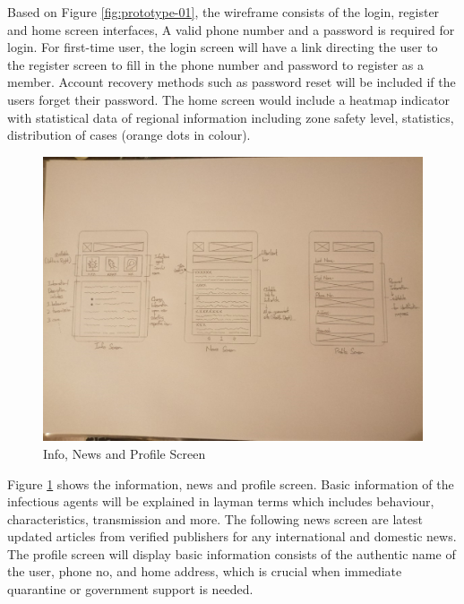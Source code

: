       \par Based on Figure \ref{fig:prototype-01}, the wireframe consists of the login, register and home screen interfaces, A valid phone number and a password is required for login. For first-time user, the login screen will have a link directing the user to the register screen to fill in the phone number and password to register as a member. Account recovery methods such as password reset will be included if the users forget their password. The home screen would include a heatmap indicator with statistical data of regional information including zone safety level, statistics, distribution of cases (orange dots in colour).
      
      \begin{figure}[H]
        \centering
        \includegraphics[width=18cm]{img/low-fidelity-prototype/sketch-2.png}
        \caption{Info, News and Profile Screen}
        \label{fig:prototype-02}
      \end{figure}

      \par Figure \ref{fig:prototype-02} shows the information, news and profile screen. Basic information of the infectious agents will be explained in layman terms which includes behaviour, characteristics, transmission and more. The following news screen are latest updated articles from verified publishers for any international and domestic news. The profile screen will display basic information consists of the authentic name of the user, phone no, and home address, which is crucial when immediate quarantine or government support is needed.

